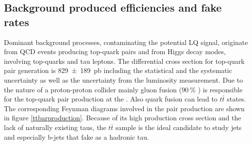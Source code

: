 \subsection{Background produced efficiencies and fake rates}\label{bgeff}
Dominant background processes, contaminating the potential LQ signal, originate from QCD events producing top-quark pairs and from Higgs decay modes, involving top-quarks and tau leptons.\newline
The differential cross section for top-quark pair generation is \SI{829\pm189}{\pico\barn} \cite{ttbarpairproduction} including the statistical and the systematic uncertainty as well as the uncertainty from the luminosity measurement. Due to the nature of a proton-proton collider mainly gluon fusion ($\SI{90}{\percent}$ \cite{PhysRevD}) is responsible for the top-quark pair production at the {\LHC}. Also quark fusion can lead to $t\bar{t}$ states. The corresponding Feynman diagrams involved in the pair production are shown in figure \ref{ttbarproduction}. Because of its high production cross section and the lack of naturally existing taus, the $t\bar{t}$ sample is the ideal candidate to study jets and especially b-jets that fake as a hadronic tau.  
%
